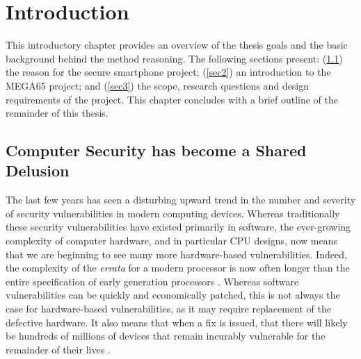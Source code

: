 
\chapter{Introduction} %

\label{Chapter1} %


This introductory chapter provides an overview of the thesis goals and the basic background behind the method reasoning. 
The following sections present: (\ref{sec1}) the reason for the secure smartphone project; (\ref{sec2}) an introduction to the MEGA65 project; and (\ref{sec3}) the scope, research questions and design requirements of the project. 
This chapter concludes with a brief outline of the remainder of this thesis.

\section{Computer Security has become a Shared Delusion}
\label{sec1}

The last few years has seen a disturbing upward trend in the number and severity of security vulnerabilities in modern computing devices.
Whereas traditionally these security vulnerabilities have existed primarily in software, the ever-growing complexity of computer hardware, and in particular CPU designs, now means that we are beginning to see many more hardware-based vulnerabilities.
Indeed, the complexity of the {\em errata} for a modern processor is now often longer\citep{6thGener70:online} than the entire specification of early generation processors \citep{mos6500m32:online}.
Whereas software vulnerabilities can be quickly and economically patched, this is not always the case for hardware-based vulnerabilities, as it may require replacement of the defective hardware\citep{WillHuge39:online}.  
It also means that when a fix is issued, that there will likely be hundreds of millions of devices that remain incurably vulnerable for the remainder of their lives \citep{Intellef1:online}.


